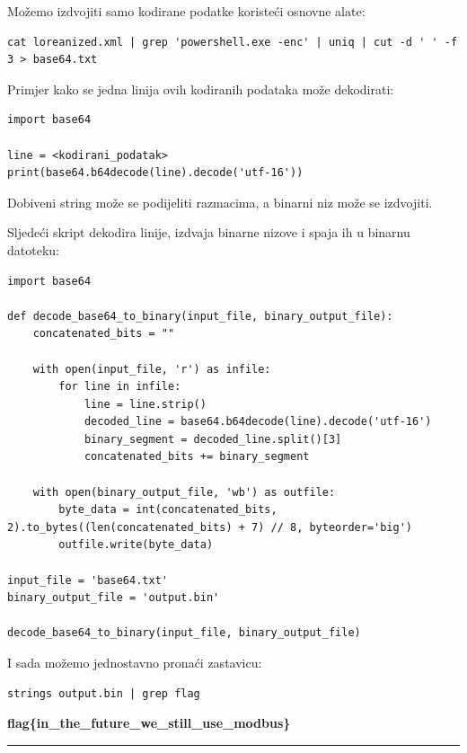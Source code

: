 \documentclass{article}
\begin{document}
Možemo izdvojiti samo kodirane podatke koristeći osnovne alate:
\begin{verbatim}
cat loreanized.xml | grep 'powershell.exe -enc' | uniq | cut -d ' ' -f 3 > base64.txt
\end{verbatim}

Primjer kako se jedna linija ovih kodiranih podataka može dekodirati:
\begin{verbatim}
import base64

line = <kodirani_podatak>
print(base64.b64decode(line).decode('utf-16'))
\end{verbatim}

Dobiveni string može se podijeliti razmacima, a binarni niz može se izdvojiti.

Sljedeći skript dekodira linije, izdvaja binarne nizove i spaja ih u binarnu datoteku:
\begin{verbatim}
import base64

def decode_base64_to_binary(input_file, binary_output_file):
    concatenated_bits = ""

    with open(input_file, 'r') as infile:
        for line in infile:
            line = line.strip()
            decoded_line = base64.b64decode(line).decode('utf-16')
            binary_segment = decoded_line.split()[3]
            concatenated_bits += binary_segment

    with open(binary_output_file, 'wb') as outfile:
        byte_data = int(concatenated_bits, 2).to_bytes((len(concatenated_bits) + 7) // 8, byteorder='big')
        outfile.write(byte_data)

input_file = 'base64.txt'
binary_output_file = 'output.bin'

decode_base64_to_binary(input_file, binary_output_file)
\end{verbatim}

I sada možemo jednostavno pronaći zastavicu:
\begin{verbatim}
strings output.bin | grep flag
\end{verbatim}


\begin{tcolorbox}[
    colback=gray!5,  %
    colframe=gray!75,  %
    title=\textbf{Zastavica}]
    \begin{center}
        \textbf{flag\{in\_the\_future\_we\_still\_use\_modbus\}}
    \end{center}
\end{tcolorbox}
\noindent\rule{\textwidth}{0.4pt}
\end{document}
